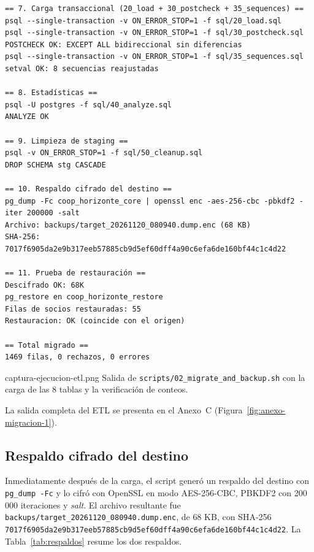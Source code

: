 \begin{lstlisting}[style=terminal,caption={Salida real de la migración con pgloader + staging},label={lst:salida-etl}]
== 7. Carga transaccional (20_load + 30_postcheck + 35_sequences) ==
psql --single-transaction -v ON_ERROR_STOP=1 -f sql/20_load.sql
psql --single-transaction -v ON_ERROR_STOP=1 -f sql/30_postcheck.sql
POSTCHECK OK: EXCEPT ALL bidireccional sin diferencias
psql --single-transaction -v ON_ERROR_STOP=1 -f sql/35_sequences.sql
setval OK: 8 secuencias reajustadas

== 8. Estadísticas ==
psql -U postgres -f sql/40_analyze.sql
ANALYZE OK

== 9. Limpieza de staging ==
psql -v ON_ERROR_STOP=1 -f sql/50_cleanup.sql
DROP SCHEMA stg CASCADE

== 10. Respaldo cifrado del destino ==
pg_dump -Fc coop_horizonte_core | openssl enc -aes-256-cbc -pbkdf2 -iter 200000 -salt
Archivo: backups/target_20261120_080940.dump.enc (68 KB)
SHA-256: 7017f6905da2e9b317eeb57885cb9d5ef60dff4a90c6efa6de160bf44c1c4d22

== 11. Prueba de restauración ==
Descifrado OK: 68K
pg_restore en coop_horizonte_restore
Filas de socios restauradas: 55
Restauracion: OK (coincide con el origen)

== Total migrado ==
1469 filas, 0 rechazos, 0 errores
\end{lstlisting}

%
  {captura-ejecucion-etl.png}%
  {Salida de \texttt{scripts/02\_migrate\_and\_backup.sh} con la carga de las 8 tablas y la verificación de conteos.}

La salida completa del ETL se presenta en el Anexo~C
(Figura~\ref{fig:anexo-migracion-1}).

\subsection{Respaldo cifrado del destino}

Inmediatamente después de la carga, el script generó un respaldo del destino
con \texttt{pg\_dump -Fc} y lo cifró con OpenSSL en modo AES-256-CBC, PBKDF2
con 200\,000 iteraciones y \emph{salt}. El archivo resultante fue
\texttt{backups/target\_20261120\_080940.dump.enc}, de 68 KB, con SHA-256
\texttt{7017f6905da2e9b317eeb57885cb9d5ef60dff4a90c6efa6de160bf44c1c4d22}.
La Tabla~\ref{tab:respaldos} resume los dos respaldos.

